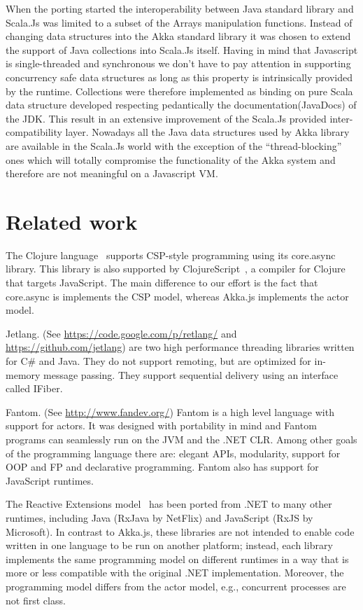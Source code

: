 \documentclass{sig-alternate}
\begin{document}
When the porting started the interoperability between Java standard library and Scala.Js was limited to a subset of the Arrays manipulation functions.
Instead of changing data structures into the Akka standard library it was chosen to extend the support of Java collections into Scala.Js itself.
Having in mind that Javascript is single-threaded and synchronous we don't have to pay attention in supporting concurrency safe data structures as long as this property is intrinsically provided by the runtime.
Collections were therefore implemented as binding on pure Scala data structure developed respecting pedantically the documentation(JavaDocs) of the JDK.
This result in an extensive improvement of the Scala.Js provided inter-compatibility layer.
Nowadays all the Java data structures used by Akka library are available in the Scala.Js world with the exception of the ``thread-blocking'' ones which will totally compromise the functionality of the Akka system and therefore are not meaningful on a Javascript VM.

\section{Related work}\label{sec:related}

The Clojure language~\cite{Halloway09} supports CSP-style programming using its
core.async library. This library is also supported by
ClojureScript~\cite{ClojureScript}, a compiler for Clojure that targets
JavaScript. The main difference to our effort is the fact that core.async is
implements the CSP model, whereas Akka.js implements the actor model.

Jetlang. (See \url{https://code.google.com/p/retlang/} and \url{https://github.com/jetlang}) are two high performance threading libraries written for C\# and Java. They do not support remoting, but are optimized for in-memory message passing. They support sequential delivery using an interface called IFiber.

Fantom. (See \url{http://www.fandev.org/}) Fantom is a high level language with support for actors. It was designed with portability in mind and Fantom programs can seamlessly run on the JVM and the .NET CLR. Among other goals of the programming language there are: elegant APIs, modularity, support for OOP and FP and declarative programming. Fantom also has support for JavaScript runtimes.

The Reactive Extensions model~\cite{Meijer12} has been ported from .NET to
many other runtimes, including Java (RxJava by NetFlix) and JavaScript (RxJS
by Microsoft). In contrast to Akka.js, these libraries are not intended to
enable code written in one language to be run on another platform; instead,
each library implements the same programming model on different runtimes in a
way that is more or less compatible with the original .NET implementation.
Moreover, the programming model differs from the actor model, e.g., concurrent
processes are not first class.
\end{document}
